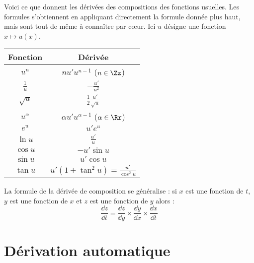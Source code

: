 \documentclass[11pt,class=report,crop=false]{standalone}
\begin{document}
Voici ce que donnent les dérivées des compositions des fonctions usuelles. Les formules s'obtiennent en appliquant directement la formule donnée plus haut, mais sont tout de même à connaître par c\oe ur.
Ici $u$ désigne une fonction $x \mapsto u(x)$.
\begin{center}
\setlength{\arrayrulewidth}{0.05mm}
\begin{tabular}[t]{|c|c@{\vrule depth 1.2ex height 3ex width 0mm \ }|}
\hline
\textbf{Fonction}         & \textbf{Dérivée} \\ \hline
   $u^n$         & $nu'u^{n-1}$  \quad  ($n \in \Zz$)   \\ \hline
   $\frac 1u$    & $-\frac{u'}{u^2}$              \\ \hline
   $\sqrt{u}$    & $\frac12 \frac{u'}{\sqrt{u}}$   \\ \hline
   $u^\alpha$    & $\alpha u' u^{\alpha-1}$ \quad ($\alpha\in\Rr$)  \\ \hline
   $e^u$         & $u'e^u$                        \\ \hline
   $\ln u$       & $\frac {u'}{u}$                   \\ \hline
   $\cos u$      & $-u'\sin u$                    \\ \hline
   $\sin u$      & $u'\cos u$                     \\ \hline
   $\tan u$      & $u'(1+\tan^2 u) = \frac{u'}{\cos^2 u}$        \\ \hline
\end{tabular}
\hfill
\end{center}


La formule de la dérivée de composition se généralise : si $x$ est une fonction de $t$, $y$ est une fonction de $x$ et $z$ est une fonction de $y$ alors :
$$\frac{\dd z}{\dd t}  = \frac{\dd z}{\dd y} \times \frac{\dd y}{\dd x} \times \frac{\dd x}{\dd t}$$



\section{Dérivation automatique}


\end{document}
